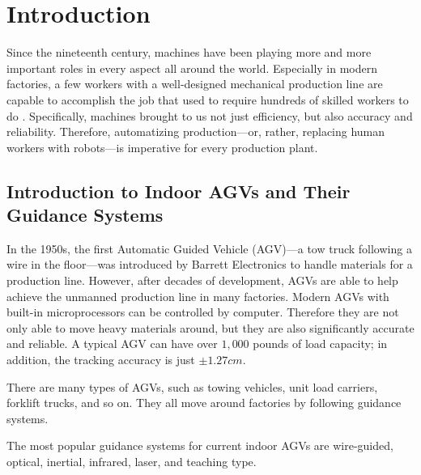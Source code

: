 %
%
%


\chapter{Introduction}

Since the nineteenth century, machines have been playing more and more important roles in every aspect all around the world. Especially in modern factories, a few workers with a well-designed mechanical production line are capable to accomplish the job that used to require hundreds of skilled workers to do . Specifically, machines brought to us not just efficiency, but also accuracy and reliability. Therefore, automatizing production—or, rather, replacing human workers with robots—is imperative for every production plant.


\section{Introduction to Indoor AGVs and Their Guidance Systems}

In the 1950s, the first Automatic Guided Vehicle (AGV)—a tow truck following a wire in the floor—was introduced by Barrett Electronics to handle materials for a production line. \cite{olmi2011traffic} However, after decades of development, AGVs are able to help achieve the unmanned production line in many factories. Modern AGVs with built-in microprocessors can be controlled by computer. Therefore they are not only able to move heavy materials around, but they are also significantly accurate and reliable. A typical AGV can have over $1,000$ pounds of load capacity; in addition, the tracking accuracy is just $\pm 1.27 cm$. \cite{KESH} 
		
There are many types of AGVs, such as towing vehicles, unit load carriers, forklift trucks, and so on. They all move around factories by following guidance systems.  
		
The most popular guidance systems for current indoor AGVs are wire-guided, optical, inertial, infrared, laser, and teaching type. \cite{KESH}

